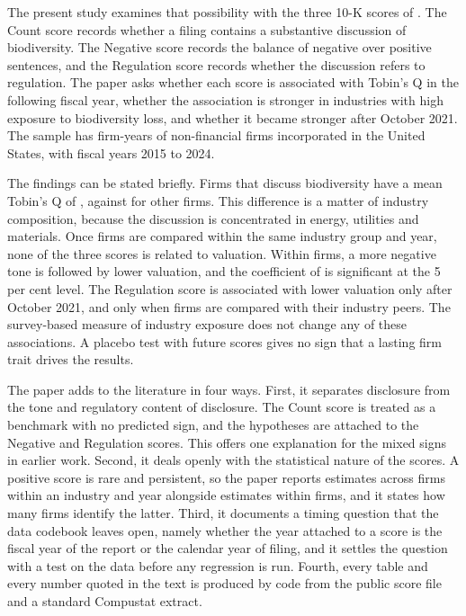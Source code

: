 \documentclass[12pt,a4paper]{article}
\begin{document}
The present study examines that possibility with the three 10-K scores of \citet{giglio2026}. The Count score records whether a filing contains a substantive discussion of biodiversity. The Negative score records the balance of negative over positive sentences, and the Regulation score records whether the discussion refers to regulation. The paper asks whether each score is associated with Tobin's Q in the following fiscal year, whether the association is stronger in industries with high exposure to biodiversity loss, and whether it became stronger after October 2021. The sample has \nFinal{} firm-years of non-financial firms incorporated in the United States, with fiscal years 2015 to 2024.

The findings can be stated briefly. Firms that discuss biodiversity have a mean Tobin's Q of \meanQOne{}, against \meanQZero{} for other firms. This difference is a matter of industry composition, because the discussion is concentrated in energy, utilities and materials. Once firms are compared within the same industry group and year, none of the three scores is related to valuation. Within firms, a more negative tone is followed by lower valuation, and the coefficient of \coefFAllNeg{} is significant at the 5 per cent level. The Regulation score is associated with lower valuation only after October 2021, and only when firms are compared with their industry peers. The survey-based measure of industry exposure does not change any of these associations. A placebo test with future scores gives no sign that a lasting firm trait drives the results.

The paper adds to the literature in four ways. First, it separates disclosure from the tone and regulatory content of disclosure. The Count score is treated as a benchmark with no predicted sign, and the hypotheses are attached to the Negative and Regulation scores. This offers one explanation for the mixed signs in earlier work. Second, it deals openly with the statistical nature of the scores. A positive score is rare and persistent, so the paper reports estimates across firms within an industry and year alongside estimates within firms, and it states how many firms identify the latter. Third, it documents a timing question that the data codebook leaves open, namely whether the year attached to a score is the fiscal year of the report or the calendar year of filing, and it settles the question with a test on the data before any regression is run. Fourth, every table and every number quoted in the text is produced by code from the public score file and a standard Compustat extract.
\end{document}
